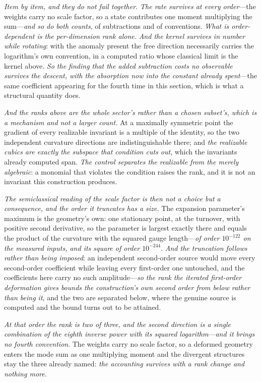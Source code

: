 \documentclass[11pt,a4paper]{article}
\theoremstyle{plain}
\theoremstyle{definition}
\theoremstyle{remark}
\begin{document}
\emph{Item by item, and they do not fail together.} \emph{The rate survives at every order}---the weights
carry no scale factor, so a state contributes one moment multiplying the sum---\emph{and so do both counts},
of subtractions and of conventions. \emph{What is order-dependent is the per-dimension rank alone.}
\emph{And the kernel survives in number while rotating}: with the anomaly present the free direction
necessarily carries the logarithm's own convention, in a computed ratio whose classical limit is the kernel
above. \emph{So the finding that the added subtraction costs no observable survives the descent, with the
absorption now into the constant already spent}---the same coefficient appearing for the fourth time in this
section, which is what a structural quantity does.

\emph{And the ranks above are the whole sector's rather than a chosen subset's, which is a mechanism and not
a larger count.} At a maximally symmetric point the gradient of every realizable invariant is a multiple of
the identity, so the two independent curvature directions are indistinguishable there; and \emph{the
realizable cubics are exactly the subspace that condition cuts out}, which the invariants already computed
span. \emph{The control separates the realizable from the merely algebraic}: a monomial that violates the
condition raises the rank, and it is not an invariant this construction produces.

\emph{The semiclassical reading of the scale factor is then not a choice but a consequence, and the order it
truncates has a size.} The expansion parameter's maximum is the geometry's own: one stationary point, at the
turnover, with positive second derivative, so the parameter is largest exactly there and equals the product
of the curvature with the squared gauge length---\emph{of order $10^{-122}$ on the measured inputs, and its
square of order $10^{-244}$}. \emph{And the truncation follows rather than being imposed}: an independent
second-order source would move every second-order coefficient while leaving every first-order one untouched,
and the coefficients here carry no such amplitude---\emph{so the rank the iterated first-order deformation
gives bounds the construction's own second order from below rather than being it}, and the two are separated
below, where the genuine source is computed and the bound turns out to be attained.

\emph{At that order the rank is two of three, and the second direction is a single combination of the eighth
inverse power with its squared logarithm}---\emph{and it brings no fourth convention}. The weights carry no
scale factor, so a deformed geometry enters the mode sum as one multiplying moment and the divergent
structures stay the three already named: \emph{the accounting survives with a rank change and nothing
more}.
\end{document}
